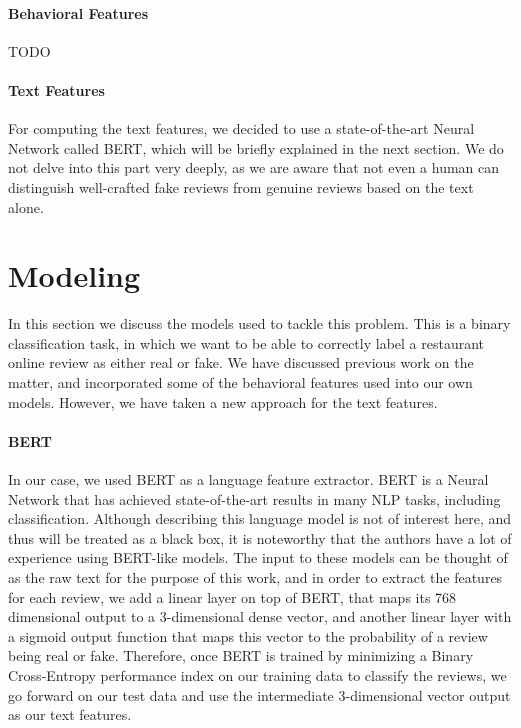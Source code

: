 \documentclass[man, floatsintext, 10pt]{apa6}
\begin{document}
\vspace{2mm}

\paragraph{Behavioral Features} TODO

 \vspace{2mm}
 
\paragraph{Text Features} For computing the text features, we decided to use a state-of-the-art Neural Network called BERT, which will be briefly explained in the next section. We do not delve into this part very deeply, as we are aware that not even a human can distinguish well-crafted fake reviews from genuine reviews based on the text alone.


\section{Modeling}

In this section we discuss the models used to tackle this problem. This is a binary classification task, in which we want to be able to correctly label a restaurant online review as either real or fake. We have discussed previous work on the matter, and incorporated some of the behavioral features used into our own models. However, we have taken a new approach for the text features.

\vspace{2mm}

\paragraph{BERT} In our case, we used BERT as a language feature extractor. BERT is a Neural Network that has achieved state-of-the-art results in many NLP tasks, including classification. Although describing this language model is not of interest here, and thus will be treated as a black box, it is noteworthy that the authors have a lot of experience using BERT-like models. The input to these models can be thought of as the raw text for the purpose of this work, and in order to extract the features for each review, we add a linear layer on top of BERT, that maps its 768 dimensional output to a 3-dimensional dense vector, and another linear layer with a sigmoid output function that maps this vector to the probability of a review being real or fake. Therefore, once BERT is trained by minimizing a Binary Cross-Entropy performance index on our training data to classify the reviews, we go forward on our test data and use the intermediate 3-dimensional vector output as our text features. 
\end{document}
